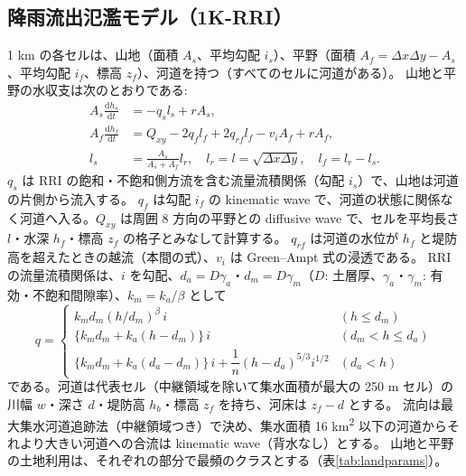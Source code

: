 \documentclass[a4paper,10pt]{ltjsarticle}
\begin{document}
\subsection{降雨流出氾濫モデル（1K-RRI）}
\label{sec:k1rri}
1 km の各セルは、山地（面積 $A_s$、平均勾配 $i_s$）、平野（面積 $A_f=\Delta x\Delta y-A_s$、平均勾配 $i_f$、標高 $z_f$）、河道を持つ（すべてのセルに河道がある）。
山地と平野の水収支は次のとおりである\cite{sugawara2024}:
\begin{align}
A_s\frac{\mathrm{d}h_s}{\mathrm{d}t}&=-q_s l_s+rA_s, \label{eq:k1s}\\
A_f\frac{\mathrm{d}h_f}{\mathrm{d}t}&=Q_{xy}-2q_f l_f+2q_{rf}l_f-v_iA_f+rA_f, \label{eq:k1f}\\
l_s&=\frac{A_s}{A_s+A_f}l_r,\quad l_r=l=\sqrt{\Delta x\Delta y},\quad l_f=l_r-l_s. \label{eq:k1l}
\end{align}
$q_s$ は RRI の飽和・不飽和側方流を含む流量流積関係\cite{tachikawa2004}（勾配 $i_s$）で、山地は河道の片側から流入する。
$q_f$ は勾配 $i_f$ の kinematic wave で、河道の状態に関係なく河道へ入る。$Q_{xy}$ は周囲 8 方向の平野との diffusive wave で、セルを平均長さ $l$・水深 $h_f$・標高 $z_f$ の格子とみなして計算する。
$q_{rf}$ は河道の水位が $h_f$ と堤防高を超えたときの越流（本間の式\cite{honma1940}）、$v_i$ は Green–Ampt 式\cite{greenampt1911}の浸透である。
RRI の流量流積関係は、$i$ を勾配、$d_a=D\gamma_a$・$d_m=D\gamma_m$（$D$: 土層厚、$\gamma_a$・$\gamma_m$: 有効・不飽和間隙率）、$k_m=k_a/\beta$ として
\begin{equation}
q=\begin{cases}
k_m d_m (h/d_m)^{\beta}\, i & (h\le d_m)\\
\{k_m d_m + k_a(h-d_m)\}\, i & (d_m<h\le d_a)\\
\{k_m d_m + k_a(d_a-d_m)\}\, i + \dfrac{1}{n}(h-d_a)^{5/3} i^{1/2} & (d_a<h)
\end{cases}
\label{eq:slope}
\end{equation}
である。河道は代表セル（中継領域を除いて集水面積が最大の 250 m セル）の川幅 $w$・深さ $d$・堤防高 $h_b$・標高 $z_f$ を持ち、河床は $z_f-d$ とする。
流向は最大集水河道追跡法（中継領域つき）\cite{masutani2006}で決め、集水面積 16 km\textsuperscript{2} 以下の河道からそれより大きい河道への合流は kinematic wave（背水なし）とする\cite{sugawara2024}。
山地と平野の土地利用は、それぞれの部分で最頻のクラスとする（表\ref{tab:landparams}）。
\end{document}
